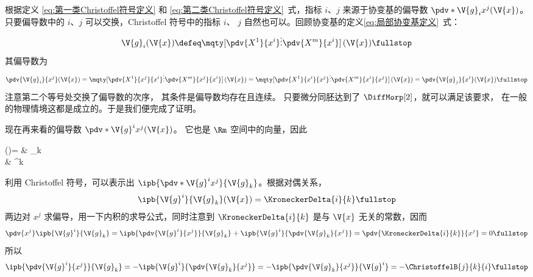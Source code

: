 \begin{myProof}
根据定义 \eqref{eq:第一类Christoffel符号定义} 和
\eqref{eq:第二类Christoffel符号定义}~式，指标 $i$、$j$
来源于协变基的偏导数 $\pdv*{\V{g}_i}{x^j} (\V{x})$。
只要偏导数中的 $i$、$j$ 可以交换，Christoffel 符号中的指标 $i$、
$j$ 自然也可以。回顾协变基的定义\eqref{eq:局部协变基定义}~式：
\begin{equation}
	\V{g}_i (\V{x})
	\defeq\mqty[\displaystyle\pdv{X^1}{x^i} \\[1ex]
		\vdots \\[0.7ex] \displaystyle\pdv{X^m}{x^i}]\,(\V{x})
	\fullstop
\end{equation}
其偏导数为
\begin{equation}
	\pdv{\V{g}_i}{x^j} (\V{x})
	=\mqty[\displaystyle\pdv{X^1}{x^j}{x^i} \\[1ex]
		\vdots \\[0.7ex] \displaystyle\pdv{X^m}{x^j}{x^i}]\,(\V{x})
	=\mqty[\displaystyle\pdv{X^1}{x^i}{x^j} \\[1ex]
		\vdots \\[0.7ex] \displaystyle\pdv{X^m}{x^i}{x^j}]\,(\V{x})
	=\pdv{\V{g}_j}{x^i} (\V{x}) \fullstop
\end{equation}
注意第二个等号处交换了偏导数的次序，
其条件是偏导数均存在且连续。
只要微分同胚达到了 $\DiffMorp[2]$，就可以满足该要求，
在一般的物理情境这都是成立的。于是我们便完成了证明。
\end{myProof}

现在再来看的偏导数 $\pdv*{\V{g}^i}{x^j} (\V{x})$。
它也是 $\Rm$ 空间中的向量，因此
\begin{braceEq*}
	{\label{eq:逆变基偏导数的协变与逆变表示}  ()=}
	& _k \comma \\
	& ^k \fullstop
\end{braceEq*}
利用 Christoffel 符号，可以表示出
$\ipb{\pdv*{\V{g}^i}{x^j}}{\V{g}_k}$。根据对偶关系，
\begin{equation}
	\ipb{\V{g}^i}{\V{g}_k} (\V{x})=\KroneckerDelta{i}{k} \fullstop
\end{equation}
两边对 $x^j$ 求偏导，用一下内积的求导公式，同时注意到
$\KroneckerDelta{i}{k}$ 是与 $\V{x}$ 无关的常数，因而
\begin{equation}
	\pdv{x^j} \ipb{\V{g}^i}{\V{g}_k}
	=\ipb{\pdv{\V{g}^i}{x^j}}{\V{g}_k}
		+\ipb{\V{g}^i}{\pdv{\V{g}_k}{x^j}}
	=\pdv{\KroneckerDelta{i}{k}}{x^j}=0 \fullstop
\end{equation}
所以
\begin{equation}
	\ipb{\pdv{\V{g}^i}{x^j}}{\V{g}_k}
	=-\ipb{\V{g}^i}{\pdv{\V{g}_k}{x^j}}
	=-\ipb{\pdv{\V{g}_k}{x^j}}{\V{g}^i}
	=-\ChristoffelB{j}{k}{i} \fullstop
\end{equation}

